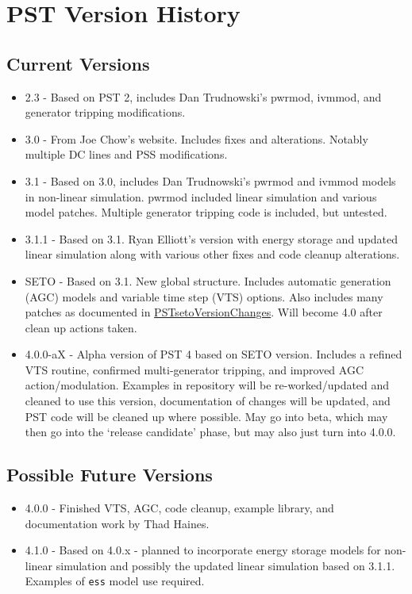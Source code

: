 \chapter{PST Version History}



\section*{Current Versions}
\begin{itemize}
 em
\item 2.3 - Based on PST 2, includes Dan Trudnowski's pwrmod, ivmmod, and generator tripping modifications.
\item 3.0 - From Joe Chow's website. 
Includes fixes and alterations. 
Notably multiple DC lines and PSS modifications.
\item 3.1 - Based on 3.0, includes Dan Trudnowski's pwrmod and ivmmod models in non-linear simulation. 
pwrmod included linear simulation and various model patches. 
Multiple generator tripping code is included, but untested.
\item 3.1.1 - Based on 3.1. Ryan Elliott's version with energy storage and updated linear simulation along with various other fixes and code cleanup alterations. 
\item SETO - Based on 3.1. New global structure. 
Includes automatic generation (AGC) models and variable time step (VTS) options. 
Also includes many patches as documented in 
\href{https://github.com/thadhaines/MT-Tech-SETO/tree/master/researchDocs/TEX/one-offs/200709-PSTsetoVersionChanges}{PSTsetoVersionChanges}. 
% 
Will become 4.0 after clean up actions taken.
\item 4.0.0-aX - Alpha version of PST 4 based on SETO version. 
Includes a refined VTS routine, confirmed multi-generator tripping, and improved AGC action/modulation.
Examples in repository will be re-worked/updated and cleaned to use this version, 
documentation of changes will be updated, 
and PST code will be cleaned up where possible.
May go into beta, which may then go into the `release candidate' phase, but may also just turn into 4.0.0.
\end{itemize}

\section*{Possible Future Versions}
\begin{itemize}
 em
\item 4.0.0 - Finished VTS, AGC, code cleanup, example library, and documentation work by Thad Haines.
\item 4.1.0 - Based on 4.0.x - planned to incorporate energy storage models for non-linear simulation and possibly the updated linear simulation based on 3.1.1. Examples of \verb|ess| model use required.
\end{itemize}